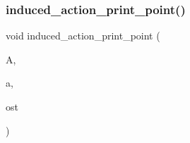 \subsubsection{\texorpdfstring{induced\+\_\+action\+\_\+print\+\_\+point()}{induced\_action\_print\_point()}}
{\footnotesize\ttfamily void induced\+\_\+action\+\_\+print\+\_\+point (\begin{DoxyParamCaption}\item[{\mbox{\hyperlink{classaction}{action}} \&}]{A,  }\item[{\mbox{\hyperlink{galois_8h_a09fddde158a3a20bd2dcadb609de11dc}{I\+NT}}}]{a,  }\item[{ostream \&}]{ost }\end{DoxyParamCaption})}

